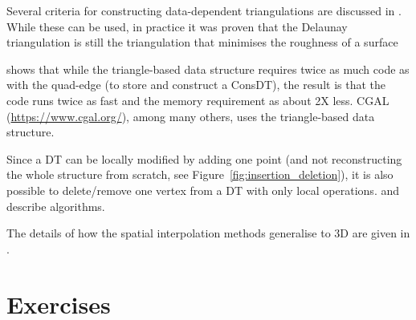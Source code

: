 Several criteria for constructing data-dependent triangulations are discussed in \citet{Dyn90}. 
While these can be used, in practice it was proven that the Delaunay triangulation is still the triangulation that minimises the roughness of a surface~\citep{Wang01,Rippa90}


\citet{Shewchuk97} shows that while the triangle-based data structure requires twice as much code as with the quad-edge (to store and construct a ConsDT), the result is that the code runs twice as fast and the memory requirement as about 2X less.
CGAL (\url{https://www.cgal.org/}), among many others, uses the triangle-based data structure.

Since a DT can be locally modified by adding one point (and not reconstructing the whole structure from scratch, see Figure~\ref{fig:insertion_deletion}), it is also possible to delete/remove one vertex from a DT with only local operations.
\citet{Mostafavi03} and \citet{Devillers09} describe algorithms.

The details of how the spatial interpolation methods generalise to 3D are given in \citet{Ledoux05}.

%
\section{Exercises}

